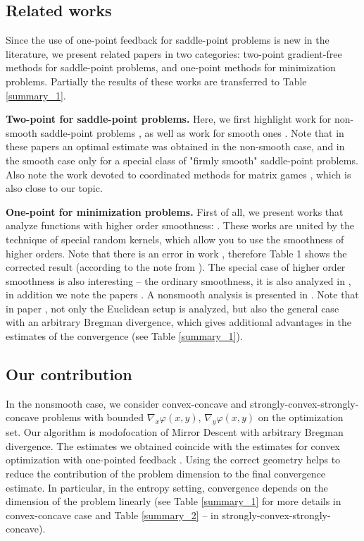 \documentclass[runningheads]{llncs}
\begin{document}
\subsection{Related works} 

Since the use of one-point feedback for saddle-point problems is new in the literature, we present related papers in two categories: two-point gradient-free methods for saddle-point problems, and one-point methods for minimization problems. Partially the results of these works are transferred to Table \ref{summary_1}.

\textbf{Two-point for saddle-point problems.} Here, we first highlight work for non-smooth saddle-point problems \cite{aleks2020gradientfree}, as well as work for smooth ones \cite{sadiev2020zeroth}. Note that in these papers an optimal estimate was obtained in the non-smooth case, and in the smooth case only for a special class of "firmly smooth" saddle-point problems. Also note the work devoted to coordinated methods for matrix games \cite{carmon2020coordinate}, which is also close to our topic.

\textbf{One-point for minimization problems.} 
First of all, we present works that analyze functions with higher order smoothness:
\cite{bach2016highly,akhavan2020exploiting,novitskii2021improved}. These works are united by  the technique of special random kernels, which allow you to use the smoothness of higher orders. Note that there is an error in work \cite{bach2016highly}, therefore Table 1 shows the corrected result (according to the note from \cite{akhavan2020exploiting}). The special case of higher order smoothness is also interesting -- the ordinary smoothness, it is also analyzed in \cite{bach2016highly,akhavan2020exploiting,novitskii2021improved}, in addition we note the papers \cite{gasnikov2017stochastic,zhang2020improving}. A nonsmooth analysis is presented in \cite{gasnikov2017stochastic,zhang2020improving}. Note that in paper \cite{gasnikov2017stochastic}, not only the Euclidean setup is analyzed, but also the general case with an arbitrary Bregman divergence, which gives additional advantages in the estimates of the convergence (see Table \ref{summary_1}). 



\subsection{Our contribution}

In the nonsmooth case, we consider convex-concave and strongly-convex-strongly-concave problems with bounded $\nabla_x \varphi(x,y)$, $\nabla_y \varphi(x,y)$ on the optimization set. Our algorithm is modofocation of Mirror Descent with arbitrary Bregman divergence. The estimates we obtained coincide with the estimates for convex optimization with one-pointed feedback \cite{gasnikov2017stochastic,zhang2020improving}. Using the correct geometry helps to reduce the contribution of the problem dimension to the final convergence estimate. In particular, in the entropy setting, convergence depends on the dimension of the problem linearly (see Table \ref{summary_1} for more details in convex-concave case and Table \ref{summary_2} -- in strongly-convex-strongly-concave). 
\end{document}
